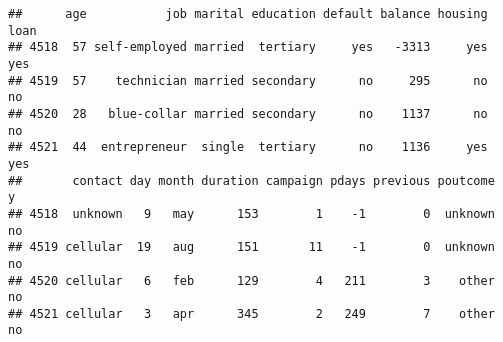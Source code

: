 \documentclass[]{article}
\begin{document}
\begin{verbatim}
##      age           job marital education default balance housing loan
## 4518  57 self-employed married  tertiary     yes   -3313     yes  yes
## 4519  57    technician married secondary      no     295      no   no
## 4520  28   blue-collar married secondary      no    1137      no   no
## 4521  44  entrepreneur  single  tertiary      no    1136     yes  yes
##       contact day month duration campaign pdays previous poutcome  y
## 4518  unknown   9   may      153        1    -1        0  unknown no
## 4519 cellular  19   aug      151       11    -1        0  unknown no
## 4520 cellular   6   feb      129        4   211        3    other no
## 4521 cellular   3   apr      345        2   249        7    other no
\end{verbatim}
\end{document}
